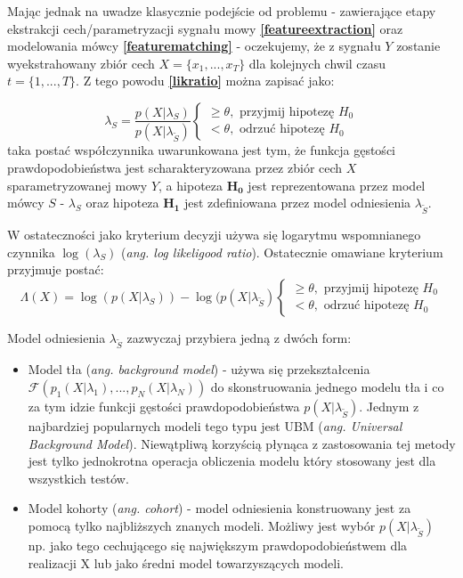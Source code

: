 Mając jednak na uwadze klasycznie podejście od problemu - zawierające etapy ekstrakcji cech/parametryzacji sygnału mowy \textbf{\ref{featureextraction}} oraz modelowania mówcy \textbf{\ref{featurematching}} - oczekujemy, że z sygnału $Y$ zostanie wyekstrahowany zbiór cech $X = \{x_1,...,x_T\}$ dla kolejnych chwil czasu $t = \{1,...,T\}$. Z tego powodu \textbf{\ref{likratio}} można zapisać jako:

\begin{equation}
  \lambda_S = \frac{p(X|\lambda_S)}{p(X|\lambda_{\tilde{S}})}
  \begin{cases}
    \ge \theta, \textrm{ przyjmij hipotezę } H_0 \\
    < \theta, \textrm{ odrzuć hipotezę } H_0
  \end{cases}
\end{equation}
taka postać współczynnika uwarunkowana jest tym, że funkcja gęstości prawdopodobieństwa jest scharakteryzowana przez zbiór cech $X$ sparametryzowanej mowy $Y$, a hipoteza $\bm{H_0}$ jest reprezentowana przez model mówcy $S$ - $\lambda_{S}$  oraz hipoteza $\bm{H_1}$ jest zdefiniowana przez model odniesienia $\lambda_{\tilde{S}}$.

W ostateczności jako kryterium decyzji używa się logarytmu wspomnianego czynnika $\log \left( \lambda_S \right)$ (\textit{ang. log likeligood ratio}). Ostatecznie omawiane kryterium przyjmuje postać:
\begin{equation}
  \label{loglike}
  \Lambda(X)= \log({p(X|\lambda_S)}) - \log({p(X|\lambda_{\tilde{S}})}
  \begin{cases}
    \ge \theta, \textrm{ przyjmij hipotezę } H_0 \\
    < \theta, \textrm{ odrzuć hipotezę } H_0
  \end{cases}
\end{equation}

Model odniesienia $\lambda_{\tilde{S}}$ zazwyczaj przybiera jedną z dwóch form:
\begin{itemize}
  \item{Model tła (\textit{ang. background model})} - używa się przekształcenia $\mathcal{F}(p_1(X|\lambda_1),...,p_N(X|\lambda_N))$ do skonstruowania jednego modelu tła i co za tym idzie funkcji gęstości prawdopodobieństwa $p(X|\lambda_{\tilde{S}})$. Jednym z najbardziej popularnych modeli tego typu jest UBM (\textit{ang. Universal Background Model}). Niewątpliwą korzyścią płynąca z zastosowania tej metody jest tylko jednokrotna operacja obliczenia modelu który stosowany jest dla wszystkich testów.
  \item{Model kohorty (\textit{ang. cohort})} - model odniesienia konstruowany jest za pomocą tylko najbliższych znanych modeli. Możliwy jest wybór $p(X|\lambda_{\tilde{S}})$ np. jako tego cechującego się największym prawdopodobieństwem dla realizacji X lub jako średni model towarzyszących modeli.
\end{itemize}

